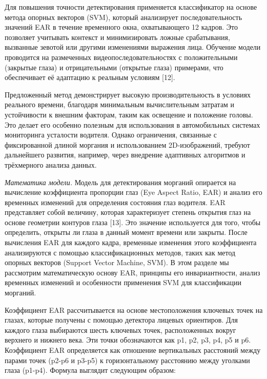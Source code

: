 Для повышения точности детектирования применяется классификатор на
основе метода опорных векторов (SVM), который анализирует
последовательность значений EAR в течение временного окна, охватывающего
12 кадров. Это позволяет учитывать контекст и минимизировать ложные
срабатывания, вызванные зевотой или другими изменениями выражения лица.
Обучение модели проводится на размеченных видеопоследовательностях с
положительными (закрытые глаза) и отрицательными (открытые глаза)
примерами, что обеспечивает её адаптацию к реальным условиям {[}12{]}.

Предложенный метод демонстрирует высокую производительность в условиях
реального времени, благодаря минимальным вычислительным затратам и
устойчивости к внешним факторам, таким как освещение и положение головы.
Это делает его особенно полезным для использования в автомобильных
системах мониторинга усталости водителя. Однако ограничения, связанные с
фиксированной длиной моргания и использованием 2D-изображений, требуют
дальнейшего развития, например, через внедрение адаптивных алгоритмов и
трёхмерного анализа данных.

\emph{Математика модели.} Модель для детектирования морганий опирается
на вычисление коэффициента пропорции глаз (Eye Aspect Ratio, EAR) и
анализ его временных изменений для определения состояния глаз водителя.
EAR представляет собой величину, которая характеризует степень открытия
глаз на основе геометрии контуров глаза {[}13{]}. Это значение
используется для того, чтобы определить, открыты ли глаза в данный
момент времени или закрыты. После вычисления EAR для каждого кадра,
временные изменения этого коэффициента анализируются с помощью
классификационных методов, таких как метод опорных векторов (Support
Vector Machine, SVM). В этом разделе мы рассмотрим математическую основу
EAR, принципы его инвариантности, анализ временных изменений и
особенности применения SVM для классификации морганий.

Коэффициент EAR рассчитывается на основе местоположения ключевых точек
на глазах, которые получены с помощью детектора лицевых ориентиров. Для
каждого глаза выбираются шесть ключевых точек, расположенных вокруг
верхнего и нижнего века. Эти точки обозначаются как p1, p2, p3, p4, p5 и
p6. Коэффициент EAR определяется как отношение вертикальных расстояний
между парами точек (p2-p6 и p3-p5) к горизонтальному расстоянию между
уголками глаза (p1-p4). Формула выглядит следующим образом:

